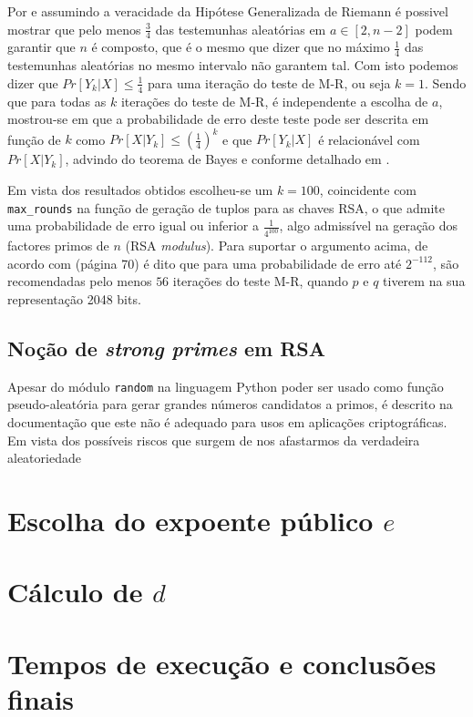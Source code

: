 \documentclass[dvipsnames]{article}
\begin{document}

\noindent Por \cite{DBLP:journals/dcc/Lenstra00} e assumindo a veracidade da Hipótese Generalizada de Riemann é possivel mostrar que pelo menos $\frac{3}{4}$ das testemunhas aleatórias em $a \in [2,n-2]$ podem garantir que $n$ é composto, que é o mesmo que dizer que no máximo $\frac{1}{4}$ das testemunhas aleatórias no mesmo intervalo não garantem tal. Com isto podemos dizer que $Pr[Y_k|X] \leq \frac{1}{4}$ para uma iteração do teste de M-R, ou seja $k=1$. Sendo que para todas as $k$ iterações do teste de M-R, é independente a escolha de $a$, mostrou-se em \cite{1204.1657v2} que a probabilidade de erro deste teste pode ser descrita em função de $k$ como $Pr[X|Y_k] \leq (\frac{1}{4})^k$ e que $Pr[Y_k|X]$ é relacionável com $Pr[X|Y_k]$, advindo do teorema de Bayes e conforme detalhado em \cite{1709.09963}.

\vskip 0.4cm

\noindent Em vista dos resultados obtidos escolheu-se um $k=100$, coincidente com \texttt{max\_rounds} na função de geração de tuplos para as chaves RSA, o que admite uma probabilidade de erro igual ou inferior a $\frac{1}{4^{100}}$, algo admissível na geração dos factores primos de $n$ (RSA \textit{modulus}). Para suportar o argumento acima, de acordo com \cite{FIPS} (página 70) é dito que para uma probabilidade de erro até $2^{-112}$, são recomendadas pelo menos $56$ iterações do teste M-R, quando $p$ e $q$ tiverem na sua representação 2048 bits.

\subsection{Noção de \textit{strong primes} em RSA}

Apesar do módulo \texttt{random} na linguagem Python poder ser usado como função pseudo-aleatória para gerar grandes números candidatos a primos, é descrito na documentação \cite{pyrandom} que este não é adequado para usos em aplicações criptográficas. Em vista dos possíveis riscos que surgem de nos afastarmos da verdadeira aleatoriedade

\section{Escolha do expoente público $e$}

\section{Cálculo de $d$}

\section{Tempos de execução e conclusões finais}



\end{document}
